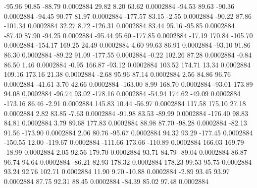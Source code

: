       -95.96       90.85      -88.79     0.0002884
       29.82        8.20       63.62     0.0002884
      -94.53       89.63      -90.36     0.0002884
      -94.45       90.77       81.97     0.0002884
     -177.57       83.15       -2.55     0.0002884
      -90.22       87.86     -101.34     0.0002884
       32.27        8.72     -126.31     0.0002884
       83.44       95.16      -95.85     0.0002884
      -87.40       87.90      -94.25     0.0002884
      -95.44       95.60     -177.85     0.0002884
      -17.19      170.84     -105.70     0.0002884
     -154.17      169.25       24.49     0.0002884
        4.60       99.63       86.91     0.0002884
      -93.10       91.86       86.30     0.0002884
      -89.22       91.09     -177.55     0.0002884
       -0.22      102.26       87.28     0.0002884
       -0.84       86.50        1.46     0.0002884
       -0.95      166.87      -93.12     0.0002884
      103.52      174.71       13.34     0.0002884
      109.16      173.16       21.38     0.0002884
       -2.68       95.96       87.14     0.0002884
        2.56       84.86       96.76     0.0002884
      -41.61        3.70       42.66     0.0002884
     -163.00        8.99      168.70     0.0002884
      -93.01      173.89       94.08     0.0002884
      -96.74       93.02     -178.16     0.0002884
      -54.94      174.62      -49.09     0.0002884
     -173.16       86.46       -2.91     0.0002884
      145.83       10.44      -56.97     0.0002884
      117.58      175.10       27.18     0.0002884
        2.82       83.85       -7.63     0.0002884
      -91.98       83.53      -89.99     0.0002884
     -176.40       98.83       84.81     0.0002884
        3.79       89.68      177.83     0.0002884
       88.98       87.70      -98.28     0.0002884
      -82.13       91.56     -173.90     0.0002884
        2.06       80.76      -95.67     0.0002884
       94.32       93.29     -177.45     0.0002884
     -150.55       12.00     -119.67     0.0002884
     -111.66      173.66     -110.89     0.0002884
      166.03      169.79      -18.99     0.0002884
        2.05       92.56      179.70     0.0002884
       93.71       84.79      -89.04     0.0002884
       86.87       96.74       94.64     0.0002884
      -86.21       82.93      178.32     0.0002884
      178.23       99.53       95.75     0.0002884
       93.24       92.76      102.71     0.0002884
       11.90        9.70      -10.88     0.0002884
       -2.89       93.45       93.97     0.0002884
       87.75       92.31       88.45     0.0002884
      -84.39       85.02       97.48     0.0002884
